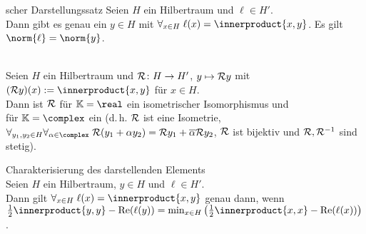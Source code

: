 \begin{Satz}{scher Darstellungssatz}
    Seien $H$ ein Hilbertraum und $\ell \in H'$.\\
    Dann gibt es genau ein $y \in H$ mit $\forall_{x \in H}\; \ell(x) = \innerproduct{x, y}$.
    Es gilt $\norm{\ell} = \norm{y}$.
\end{Satz}

\begin{Kor}\\
    Seien $H$ ein Hilbertraum und $\mathcal{R}\colon H \rightarrow H'$, $y \mapsto \mathcal{R} y$ mit
    $(\R y)(x) := \innerproduct{x, y}$ für $x \in H$.\\
    Dann ist $\mathcal{R}$ für $\KK = \real$ ein isometrischer Isomorphismus und\\
    für $\KK = \complex$ ein 
    (d.\,h. $\mathcal{R}$ ist eine Isometrie,\\
    $\forall_{y_1, y_2 \in H} \forall_{\alpha \in \complex}\;
    \R(y_1 + \alpha y_2) = \R y_1 + \overline{\alpha} \R y_2$,
    $\mathcal{R}$ ist bijektiv und $\mathcal{R}, \mathcal{R}^{-1}$ sind stetig).
\end{Kor}

\linie

\begin{Satz}{Charakterisierung des darstellenden Elements}\\
    Seien $H$ ein Hilbertraum, $y \in H$ und $\ell \in H'$.\\
    Dann gilt $\forall_{x \in H}\; \ell(x) = \innerproduct{x, y}$
    genau dann, wenn\\
    $\frac{1}{2} \innerproduct{y, y} - \Re(\ell(y)) =
    \min_{x \in H} \left(\frac{1}{2} \innerproduct{x, x} - \Re(\ell(x))\right)$.
\end{Satz}

\linie

